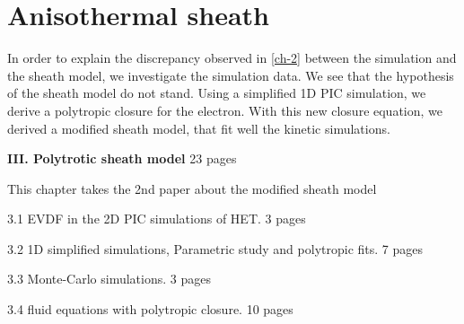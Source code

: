 



\chapter{Anisothermal sheath}
\label{ch-3}

In order to explain the discrepancy observed in \cref{ch-2} between the simulation and the sheath model, we investigate the simulation data.
We see that the hypothesis of the sheath model do not stand.
Using a simplified \ac{1D} \ac{PIC} simulation, we derive a polytropic closure for the electron.
With this new closure equation, we derived a modified sheath model, that fit well the kinetic simulations. 


{\bf III. Polytrotic sheath model} 23 pages
\begin{zzz}
  This chapter takes the 2nd paper about the modified sheath model

  3.1 EVDF in the 2D PIC simulations of HET.    3 pages

  3.2 1D simplified simulations, Parametric study and polytropic fits. 7 pages

  3.3 Monte-Carlo simulations.  3 pages

  3.4 fluid equations with polytropic closure. 10 pages
\end{zzz}


\minitoc







